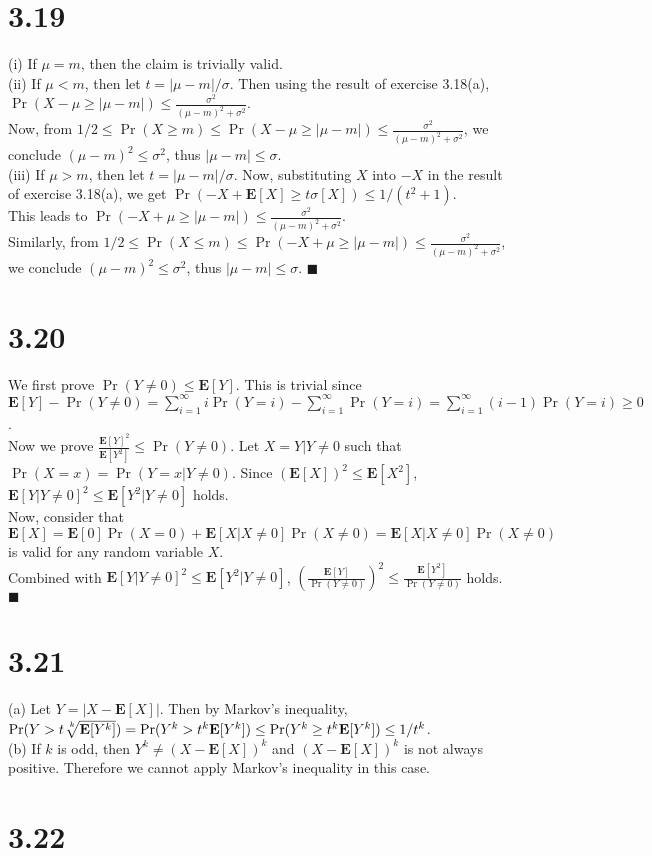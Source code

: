 \documentclass{article}
\begin{document}
\section*{3.19}
(i) If $\mu=m$, then the claim is trivially valid.\\
(ii) If $\mu < m$, then let $t=|\mu-m|/\sigma$. Then using the result of exercise 3.18(a), $\Pr(X-\mu \geq |\mu-m|) \leq \frac{\sigma^2}{(\mu-m)^2+\sigma^2}$.\\
Now, from $1/2 \leq \Pr(X\geq m) \leq \Pr(X-\mu\geq|\mu-m|) \leq \frac{\sigma^2}{(\mu-m)^2+\sigma^2}$,
we conclude $(\mu-m)^2 \leq \sigma^2$, thus $|\mu-m| \leq \sigma$.\\
(iii) If $\mu > m$, then let $t=|\mu-m|/\sigma$.
Now, substituting $X$ into $-X$ in the result of exercise 3.18(a), we get $\Pr(-X + \textbf{E}[X] \geq t\sigma[X]) \leq 1/(t^2+1)$.\\
This leads to $\Pr(-X+\mu \geq |\mu-m|) \leq \frac{\sigma^2}{(\mu-m)^2+\sigma^2}$.\\
Similarly, from $1/2 \leq \Pr(X\leq m) \leq \Pr(-X+\mu\geq|\mu-m|) \leq \frac{\sigma^2}{(\mu-m)^2+\sigma^2}$,
we conclude $(\mu-m)^2 \leq \sigma^2$, thus $|\mu-m| \leq \sigma$. $\blacksquare$
\section*{3.20}
We first prove $\Pr(Y\neq 0) \leq \textbf{E}[Y]$. This is trivial since\\
$\textbf{E}[Y]-\Pr(Y\neq 0)=\sum\limits_{i=1}^\infty i\Pr(Y=i)-\sum\limits_{i=1}^\infty \Pr(Y=i)=\sum\limits_{i=1}^\infty(i-1)\Pr(Y=i)\geq 0$.\\
Now we prove $\frac{\textbf{E}[Y]^2}{\textbf{E}[Y^2]} \leq \Pr(Y\neq 0)$.
Let $X=Y|Y\neq 0$ such that $\Pr(X=x)=\Pr(Y=x|Y\neq 0)$. Since $(\textbf{E}[X])^2 \leq \textbf{E}[X^2]$, $\textbf{E}[Y|Y\neq 0]^2 \leq \textbf{E}[Y^2|Y\neq 0]$ holds.\\
Now, consider that $\textbf{E}[X]=\textbf{E}[0]\Pr(X=0)+\textbf{E}[X|X\neq0]\Pr(X\neq 0)=\textbf{E}[X|X\neq0]\Pr(X\neq 0)$ is valid for any random variable $X$.\\
Combined with $\textbf{E}[Y|Y\neq 0]^2 \leq \textbf{E}[Y^2|Y\neq 0]$,
$\left(\frac{\textbf{E}[Y]}{\Pr(Y\neq 0)}\right)^2 \leq \frac{\textbf{E}[Y^2]}{\Pr(Y\neq 0)}$ holds. $\blacksquare$
\section*{3.21}
(a) Let $Y=|X-\textbf{E}[X]|$. Then by Markov's inequality,\\
$\Pr(Y>t\sqrt[\leftroot{-2}\uproot{2}k]{\textbf{E}[Y^k]}) =\Pr(Y^k > t^k\textbf{E}[Y^k]) \leq \Pr(Y^k \geq t^k\textbf{E}[Y^k])\leq1/t^k$.\\
(b) If $k$ is odd, then $Y^k \neq (X-\textbf{E}[X])^k$ and $(X-\textbf{E}[X])^k$ is not always positive.
Therefore we cannot apply Markov's inequality in this case.
\section*{3.22}
\end{document}
